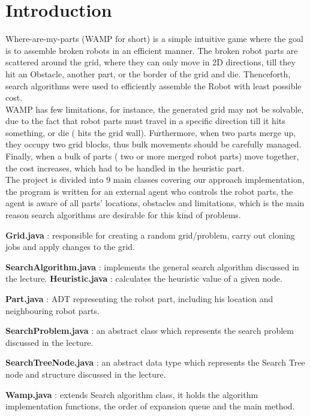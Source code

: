 \chapter{Introduction}
Where-are-my-parts (WAMP for short) is a simple intuitive game where the goal is to assemble broken robots in an efficient manner. The broken robot parts are scattered around the grid, where they can only move in 2D directions, till they hit an Obstacle, another part, or the border of the grid and die. Thenceforth, search algorithms were used to efficiently assemble the Robot with least possible cost. \\

WAMP has few limitations, for instance, the generated grid may not be solvable, due to the fact that robot parts must travel in a specific direction till it hits something, or die ( hits the grid wall). Furthermore, when two parts merge up, they occupy two grid blocks, thus bulk movements should be carefully managed. Finally, when a bulk of parts ( two or more merged robot parts) move together, the cost increases, which had to be handled in the heuristic part.\\

The project is divided into 9 main classes covering our approach implementation, the program is written for an external agent who controls the robot parts, the agent is aware of all parts' locations, obstacles and limitations, which is the main reason search algorithms are desirable for this kind of problems.

\textbf{Grid.java} : responsible for creating a random grid/problem, carry out cloning jobs and apply changes to the grid.

\textbf{SearchAlgorithm.java} : implements the general search algorithm discussed in the lecture.
\textbf{Heuristic.java }: calculates the heuristic value of a given node.

\textbf{Part.java} : ADT representing the robot part, including his location and neighbouring robot parts.

\textbf{SearchProblem.java} : an abstract class which represents the search problem discussed in the lecture.

\textbf{SearchTreeNode.java} : an abstract data type which represents the Search Tree node and structure discussed in the lecture. 

\textbf{Wamp.java} : extends Search algorithm class, it holds the algorithm implementation functions, the order of expansion queue and the main method.

